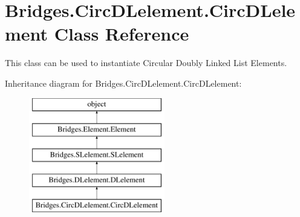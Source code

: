\hypertarget{class_bridges_1_1_circ_d_lelement_1_1_circ_d_lelement}{}\section{Bridges.\+Circ\+D\+Lelement.\+Circ\+D\+Lelement Class Reference}
\label{class_bridges_1_1_circ_d_lelement_1_1_circ_d_lelement}


This class can be used to instantiate Circular Doubly Linked List Elements.  


Inheritance diagram for Bridges.\+Circ\+D\+Lelement.\+Circ\+D\+Lelement\+:\begin{figure}[H]
\begin{center}
\leavevmode
\includegraphics[height=5.000000cm]{class_bridges_1_1_circ_d_lelement_1_1_circ_d_lelement}
\end{center}
\end{figure}
